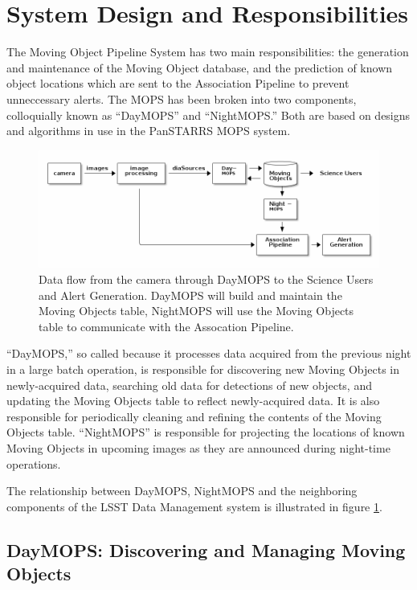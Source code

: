 \section{System Design and Responsibilities}

The Moving Object Pipeline System has two main responsibilities: the
generation and maintenance of the Moving Object database, and the
prediction of known object locations which are sent to the Association
Pipeline to prevent unneccessary alerts.  The MOPS has been broken
into two components, colloquially known as ``DayMOPS'' and ``NightMOPS.''
Both are based on designs and algorithms in use in the PanSTARRS MOPS
system.
 

\begin{figure}[!ht]
\centering
  \includegraphics[width=13cm]{illustrations/mopsWithinLsst.png}
\caption{ Data flow from the camera through DayMOPS to the Science
  Users and Alert Generation.  DayMOPS will build and maintain the
  Moving Objects table, NightMOPS will use the Moving Objects table to
  communicate with the Assocation Pipeline.  }
\label{mopsWithinLsst}
\end{figure}


``DayMOPS,'' so called because it processes data acquired from the
previous night in a large batch operation, is responsible for
discovering new Moving Objects in newly-acquired data, searching old
data for detections of new objects, and updating the Moving Objects
table to reflect newly-acquired data. It is also responsible for
periodically cleaning and refining the contents of the Moving Objects
table.  ``NightMOPS'' is responsible for projecting the locations of known
Moving Objects in upcoming images as they are announced during
night-time operations.  

The relationship between DayMOPS, NightMOPS and the neighboring
components of the LSST Data Management system is illustrated in
figure \ref{mopsWithinLsst}.

\subsection{DayMOPS: Discovering and Managing Moving Objects}


